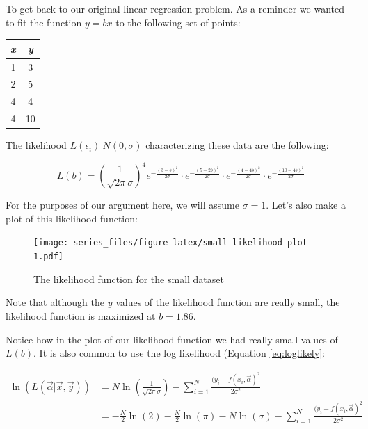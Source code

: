 \documentclass[
]{book}
\theoremstyle{definition}
\theoremstyle{definition}
\theoremstyle{definition}
\theoremstyle{remark}
\begin{document}
To get back to our original linear regression problem. As a reminder we wanted to fit the function \(y=bx\) to the following set of points:

\begin{longtable}[]{@{}cc@{}}
\toprule
\emph{x} & \emph{y} \\
\midrule
\endhead
1 & 3 \\
2 & 5 \\
4 & 4 \\
4 & 10 \\
\bottomrule
\end{longtable}

The likelihood \(L(\epsilon_{i}) ~ N(0,\sigma)\) characterizing these data are the following:

\begin{equation}
L(b) = \left( \frac{1}{\sqrt{2 \pi} \sigma}\right)^{4} e^{-\frac{(3-b)^{2}}{2\sigma}} \cdot e^{-\frac{(5-2b)^{2}}{2\sigma}}  \cdot e^{-\frac{(4-4b)^{2}}{2\sigma}}  \cdot e^{-\frac{(10-4b)^{2}}{2\sigma}} \label{eq:small-data-likely}
\end{equation}

For the purposes of our argument here, we will assume \(\sigma=1\). Let's also make a plot of this likelihood function:

\begin{figure}
\centering
\texttt{[image: series\_files/figure-latex/small-likelihood-plot-1.pdf]}
\caption{\label{fig:small-likelihood-plot}The likelihood function for the small dataset}
\end{figure}

Note that although the \(y\) values of the likelihood function are really small, the likelihood function is maximized at \(b=1.86\).

Notice how in the plot of our likelihood function we had really small values of \(L(b)\). It is also common to use the log likelihood (Equation \eqref{eq:loglikely}:

\begin{equation}
\begin{split}
\ln(L(\vec{\alpha} | \vec{x},\vec{y} )) &=  N \ln \left( \frac{1}{\sqrt{2 \pi} \sigma} \right) - \sum_{i=1}^{N} \frac{ (y_{i} - f(x_{i},\vec{\alpha} )^{2}}{ 2 \sigma^{2}} \\
 & = - \frac{N}{2} \ln (2) - \frac{N}{2} \ln(\pi) - N \ln( \sigma) - \sum_{i=1}^{N} \frac{ (y_{i} - f(x_{i},\vec{\alpha} )^{2}}{ 2 \sigma^{2}}
\end{split} \label{eq:loglikely}
\end{equation}
\end{document}
